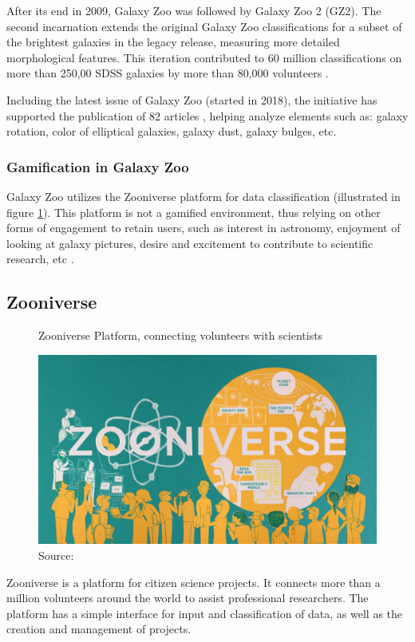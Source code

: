 After its end in 2009, Galaxy Zoo was followed by Galaxy Zoo 2 (GZ2). The second incarnation extends the original Galaxy Zoo classifications for a subset of the brightest galaxies in the legacy release, measuring more detailed morphological features. This iteration contributed to 60 million classifications on more than 250,00 SDSS galaxies by more than 80,000 volunteers \cite{galaxyzoo22021volunteers}.

Including the latest issue of Galaxy Zoo (started in 2018), the initiative has supported the publication of 82 articles \cite{galaxyzoo2021publications}, helping analyze elements such as: galaxy rotation, color of elliptical galaxies, galaxy dust, galaxy bulges, etc.

\subsubsection{Gamification in Galaxy Zoo}

Galaxy Zoo utilizes the Zooniverse platform for data classification (illustrated in figure \ref{fig:zooniverse-platform}). This platform is not a gamified environment, thus relying on other forms of engagement to retain users, such as interest in astronomy, enjoyment of looking at galaxy pictures, desire and excitement to contribute to scientific research, etc \cite{raddick2009galaxy}.

\subsection{Zooniverse}

\begin{figure}[h]
    \centering
    \caption{Zooniverse Platform, connecting volunteers with scientists}
    \includegraphics[width=0.7\linewidth]{images/background/zooniverse.jpg}
    \caption*{Source: \cite{zooniverse-logo}}
    \label{fig:zooniverse-platform}
\end{figure}

Zooniverse is a platform for citizen science projects. It connects more than a million volunteers around the world to assist professional researchers. The platform has a simple interface for input and classification of data, as well as the creation and management of projects.

